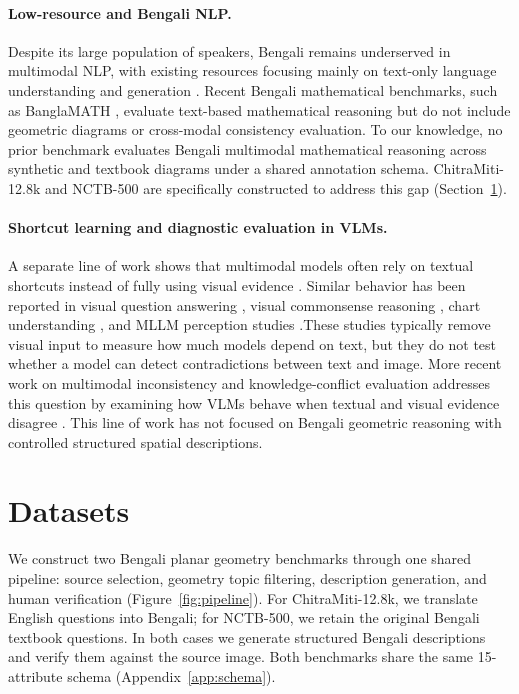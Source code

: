 \documentclass[11pt]{article}
\begin{document}
\paragraph{Low-resource and Bengali NLP.} Despite its large population of speakers, Bengali remains underserved in multimodal NLP, with existing resources focusing mainly on text-only language understanding and generation \citep{kakwani2020indicnlpsuite, hasan2021xl, bhattacharjee2022banglabert, bhattacharjee2023banglanlg}. Recent Bengali mathematical benchmarks, such as BanglaMATH \citep{prama2025banglamath}, evaluate text-based mathematical reasoning but do not include geometric diagrams or cross-modal consistency evaluation. To our knowledge, no prior benchmark evaluates Bengali multimodal mathematical reasoning across synthetic and textbook diagrams under a shared annotation schema. ChitraMiti-12.8k and NCTB-500 are specifically constructed to address this gap (Section~\ref{sec:datasets}).

\paragraph{Shortcut learning and diagnostic evaluation in VLMs.} A separate line of work shows that multimodal models often rely on textual shortcuts instead of fully using visual evidence \citep{geirhos2020shortcut}. Similar behavior has been reported in visual question answering \citep{agrawal2016analyzing, goyal2017making}, visual commonsense reasoning \citep{zellers2019recognition}, chart understanding \citep{masry2022chartqa}, and MLLM perception studies \citep{tong2024eyes}.These studies typically remove visual input to measure how much models depend on text, but they do not test whether a model can detect contradictions between text and image. More recent work on multimodal inconsistency and knowledge-conflict evaluation addresses this question by examining how VLMs behave when textual and visual evidence disagree \citep{zhu2024unraveling}. This line of work has not focused on Bengali geometric reasoning with controlled structured spatial descriptions.
\section{Datasets}
\label{sec:datasets}

We construct two Bengali planar geometry benchmarks through one shared pipeline: source selection, geometry topic filtering, description generation, and human verification (Figure~\ref{fig:pipeline}). For ChitraMiti-12.8k, we translate English questions into Bengali; for NCTB-500, we retain the original Bengali textbook questions. In both cases we generate structured Bengali descriptions and verify them against the source image. Both benchmarks share the same 15-attribute schema (Appendix~\ref{app:schema}).
\end{document}

